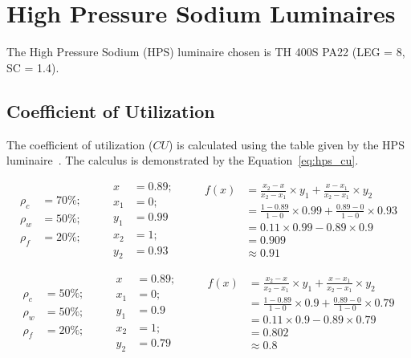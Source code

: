 \chapter{High Pressure Sodium Luminaires}

The High Pressure Sodium (HPS) luminaire chosen is TH 400S PA22 (LEG = 8, SC = 1.4).

\section{Coefficient of Utilization}
The coefficient of utilization ($CU$) is calculated using the table given by the HPS luminaire~\cite{www:hps_photometric}. The calculus is demonstrated by the Equation~\ref{eq:hps_cu}.

\begin{equation*}
\begin{split}
\rho_c &= 70\%; \\
\rho_w &= 50\%; \\
\rho_f &= 20\%;
\end{split}
\qquad
\begin{split}
x &= 0.89; \\
x_1 &= 0; \\ y_1 &= 0.99 \\
x_2 &= 1; \\ y_2 &= 0.93
\end{split}
\qquad
\begin{split}
f(x) &= \frac{x_2 - x}{x_2 - x_1} \times y_1 +
       \frac{x - x_1}{x_2 - x_1} \times y_2 \\
 &= \frac{1 - 0.89}{1 - 0} \times 0.99 +
    \frac{0.89 - 0}{1 - 0} \times 0.93 \\
 & = 0.11 \times 0.99 - 0.89 \times 0.9 \\
 & = 0.909 \\
 & \approx 0.91
\end{split}
\label{eq:hps_cu_interpol_1}
\end{equation*}

\begin{equation*}
\begin{split}
\rho_c &= 50\%; \\
\rho_w &= 50\%; \\
\rho_f &= 20\%;
\end{split}
\qquad
\begin{split}
x &= 0.89; \\
x_1 &= 0; \\ y_1 &= 0.9 \\
x_2 &= 1; \\ y_2 &= 0.79
\end{split}
\qquad
\begin{split}
f(x) &= \frac{x_2 - x}{x_2 - x_1} \times y_1 +
       \frac{x - x_1}{x_2 - x_1} \times y_2 \\
 &= \frac{1 - 0.89}{1 - 0} \times 0.9 +
    \frac{0.89 - 0}{1 - 0} \times 0.79 \\
 & = 0.11 \times 0.9 - 0.89 \times 0.79 \\
 & = 0.802 \\
 & \approx 0.8
\end{split}
\label{eq:hps_cu_interpol_2}
\end{equation*}


